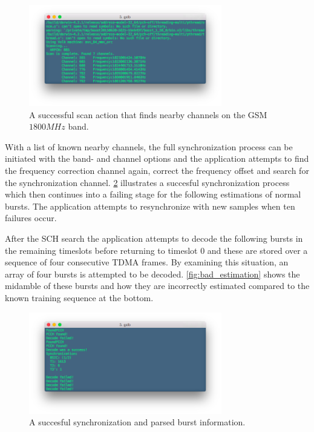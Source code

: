 \begin{figure}[H]
  \centering
  \includegraphics[width=0.75\textwidth]{figures/scan}
  \caption{A successful scan action that finds nearby channels on the
    GSM $1800\si{MHz}$ band.}
  \label{fig:scan}
\end{figure}

With a list of known nearby channels, the full synchronization process
can be initiated with the band- and channel options and the
application attempts to find the frequency correction channel again,
correct the frequency offset and search for the synchronization
channel. \cref{fig:sch_decode} illustrates a succesful
synchronization process which then continues into a failing stage for
the following estimations of normal bursts. The application attempts
to resynchronize with new samples when ten failures occur.

After the \gls{SCH} search the application attempts to decode the
following bursts in the remaining timeslots before returning to
timeslot $0$ and these are stored over a sequence of four consecutive
\gls{TDMA} frames. By examining this situation, an array of four
bursts is attempted to be decoded. \cref{fig:bad_estimation} shows the
midamble of these bursts and how they are incorrectly estimated
compared to the known training sequence at the bottom.

\begin{figure}
  \centering
  \includegraphics[width=0.75\textwidth]{figures/successful_sch_decode}
  \caption{A succesful synchronization and parsed burst information.}
  \label{fig:sch_decode}
\end{figure}

